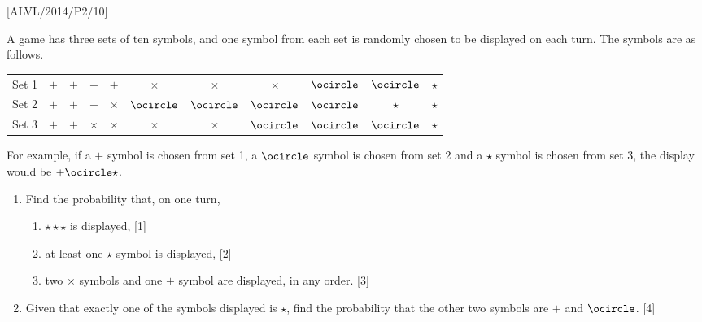 \item {[}ALVL/2014/P2/10{]}

A game has three sets of ten symbols, and one symbol from each set
is randomly chosen to be displayed on each turn. The symbols are as
follows. 
\noindent \begin{center}
\begin{tabular}{ccccccccccc}
Set 1 & $+$ & $+$ & $+$ & $+$ & $\times$ & $\times$ & $\times$ & $\ocircle$ & $\ocircle$ & $\star$\tabularnewline
Set 2 & $+$ & $+$ & $+$ & $\times$ & $\ocircle$ & $\ocircle$ & $\ocircle$ & $\ocircle$ & $\star$ & $\star$\tabularnewline
Set 3 & $+$ & $+$ & $\times$ & $\times$ & $\times$ & $\times$ & $\ocircle$ & $\ocircle$ & $\ocircle$ & $\star$\tabularnewline
\end{tabular} 
\par\end{center}

For example, if a $+$ symbol is chosen from set 1, a $\ocircle$
symbol is chosen from set 2 and a $\star$ symbol is chosen from set
3, the display would be $+\ocircle\star$. 
\begin{enumerate}
\item Find the probability that, on one turn, 
\begin{enumerate}
\item $\star\star\star$ is displayed, \hfill{}{[}1{]}
\item at least one $\star$ symbol is displayed, \hfill{}{[}2{]}
\item two $\times$ symbols and one $+$ symbol are displayed, in any order.\hfill{}
{[}3{]}
\end{enumerate}
\item Given that exactly one of the symbols displayed is $\star$, find
the probability that the other two symbols are $+$ and $\ocircle$.\hfill{}
{[}4{]}
\end{enumerate}
